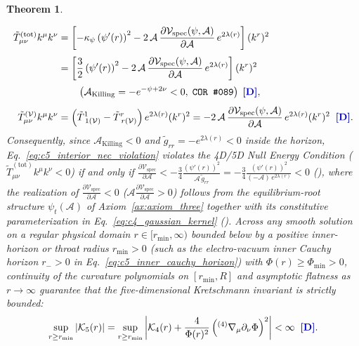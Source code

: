 \documentclass[11pt,a4paper]{article}
\newcommand{\catD}{\text{\textbf{\textcolor{blue!75!black}{[D]}}}}
\newcommand{\catH}{\text{\textbf{\textcolor{orange!80!black}{[H]}}}}
\theoremstyle{definition}
\theoremstyle{plain}
\newtheorem{theorem}[axiom]{Theorem}
\theoremstyle{remark}
\begin{document}
\begin{theorem}
\begin{enumerate}[label=(\roman*)]
  \begin{align}
  \tilde{T}_{\mu\nu}^{(\mathrm{tot})}k^\mu k^\nu &= \left[-\kappa_\psi\left(\psi'(r)\right)^2 - 2\,\mathcal{A}\,\frac{\partial\mathcal{V}_{\mathrm{spec}}(\psi, \mathcal{A})}{\partial\mathcal{A}}\,e^{2\lambda(r)}\right](k^r)^2 \nonumber \\[3pt]
  &= \left[\frac{3}{2}\left(\psi'(r)\right)^2 - 2\,\mathcal{A}\,\frac{\partial\mathcal{V}_{\mathrm{spec}}(\psi, \mathcal{A})}{\partial\mathcal{A}}\,e^{2\lambda(r)}\right](k^r)^2 \nonumber \\[2pt]
  &\qquad \left(\mathcal{A}_{\mathrm{Killing}} = -e^{-\psi+2\nu} < 0,\; \textnormal{\texttt{COR~\#089}}\right) \;\catD, \nonumber \\[4pt]
  \tilde{T}_{\mu\nu}^{(\mathcal{V})}k^\mu k^\nu &= \left(\tilde{T}^1_{\;1(\mathcal{V})} - \tilde{T}^r_{\;r(\mathcal{V})}\right)e^{2\lambda(r)}(k^r)^2
  = -2\,\mathcal{A}\,\frac{\partial\mathcal{V}_{\mathrm{spec}}(\psi, \mathcal{A})}{\partial\mathcal{A}}\,e^{2\lambda(r)}(k^r)^2 \;\;\catD. \label{eq:c5_interior_nec_violation}
  \end{align}
  Consequently, since $\mathcal{A}_{\mathrm{Killing}} < 0$ and $\tilde{g}_{rr} = -e^{2\lambda(r)} < 0$ inside the horizon, Eq.~\eqref{eq:c5_interior_nec_violation} violates the 4D/5D Null Energy Condition ($\tilde{T}_{\mu\nu}^{(\mathrm{tot})}k^\mu k^\nu < 0$) if and only if $\frac{\partial\mathcal{V}_{\mathrm{spec}}}{\partial\mathcal{A}} < -\frac{3}{4}\frac{(\psi'(r))^2}{\mathcal{A}\,\tilde{g}_{rr}} = -\frac{3}{4}\frac{(\psi'(r))^2}{(-\mathcal{A})\,e^{2\lambda(r)}} < 0$ (\catD), where the realization of $\frac{\partial\mathcal{V}_{\mathrm{spec}}}{\partial\mathcal{A}} < 0$ ($\mathcal{A}\frac{\partial\mathcal{V}_{\mathrm{spec}}}{\partial\mathcal{A}} > 0$) follows from the equilibrium-root structure $\psi_t(\mathcal{A})$ of Axiom~\ref{ax:axiom_three} together with its constitutive parameterization in Eq.~\eqref{eq:c4_gaussian_kernel} (\catH). Across any smooth solution on a regular physical domain $r \in [r_{\min}, \infty)$ bounded below by a positive inner-horizon or throat radius $r_{\min} > 0$ (such as the electro-vacuum inner Cauchy horizon $r_- > 0$ in Eq.~\eqref{eq:c5_inner_cauchy_horizon}) with $\Phi(r) \ge \Phi_{\min} > 0$, continuity of the curvature polynomials on $[r_{\min}, R]$ and asymptotic flatness as $r \to \infty$ guarantee that the five-dimensional Kretschmann invariant is strictly bounded:
  \begin{equation}\label{eq:c5_interior_kretschmann_bound}
  \sup_{r \ge r_{\min}}\left|\mathcal{K}_5(r)\right| = \sup_{r \ge r_{\min}}\left|\mathcal{K}_4(r) + \frac{4}{\Phi(r)^2}\left({}^{(4)}\nabla_\mu\partial_\nu\Phi\right)^2\right| < \infty \;\;\catD.
  \end{equation}
\end{enumerate}
\end{theorem}
\end{document}
